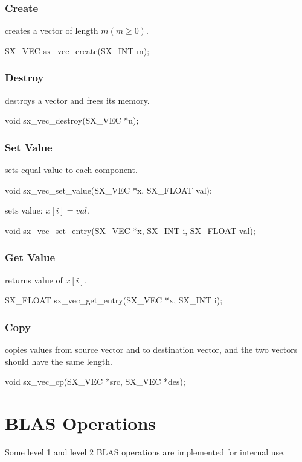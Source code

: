 \subsubsection{Create}
 creates a vector of length $m (m \ge 0)$.
\begin{evb}
SX_VEC sx_vec_create(SX_INT m);
\end{evb}

\subsubsection{Destroy}

 destroys a vector and frees its memory.
\begin{evb}
void sx_vec_destroy(SX_VEC *u);
\end{evb}

\subsubsection{Set Value}

 sets equal value to each component.
\begin{evb}
void sx_vec_set_value(SX_VEC *x, SX_FLOAT val);
\end{evb}

 sets value: $x[i] = val$.
\begin{evb}
void sx_vec_set_entry(SX_VEC *x, SX_INT i, SX_FLOAT val);
\end{evb}

\subsubsection{Get Value}
 returns value of $x[i]$.
\begin{evb}
SX_FLOAT sx_vec_get_entry(SX_VEC *x, SX_INT i);
\end{evb}

\subsubsection{Copy}
 copies values from source vector and to destination vector, and the two vectors
should have the same length.
\begin{evb}
void sx_vec_cp(SX_VEC *src, SX_VEC *des);
\end{evb}

\section{BLAS Operations}
Some level 1 and level 2 BLAS operations are implemented for internal use.

